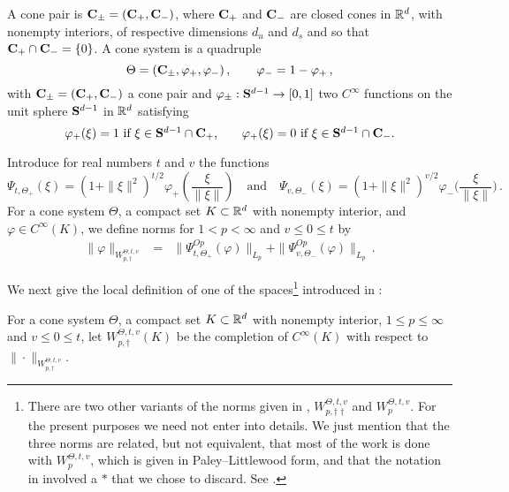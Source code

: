 \documentclass[10pt,twoside]{amsart}
\begin{document}
\begin{definition}
\label{defpol} A cone pair is 
$\mathbf{C}_\pm=(\mathbf{C}_+,\mathbf{C}_-)$, 
where  $\mathbf{C}_+$ and $\mathbf{C}_-$ are
closed cones in $\mathbb{R}^d$,  with nonempty interiors, of respective
dimensions $d_u$ and $d_s$ and so that $\mathbf{C}_+\cap\mathbf{C}_-=\{0\}$.
A cone system is a quadruple
$$\Theta=(\mathbf{C}_\pm,\varphi_+,\varphi_-)\, ,
\qquad \varphi_-=1-\varphi_+\, , $$  
with $\mathbf{C}_\pm=(\mathbf{C}_+,\mathbf{C}_-)$ a cone pair and
$\varphi_\pm:\mathbf{S}^{d-1}\to [0,1]$ two
$C^{\infty}$ functions on the unit sphere $\mathbf{S}^{d-1}$ in $\mathbb{R}^d$ satisfying
$$
 \varphi_+(\xi)=
1 \mbox{ if $\xi\in \mathbf{S}^{d-1}\cap \mathbf{C}_{+}$,}\qquad
\varphi_+(\xi)=0 \mbox{ if $\xi\in \mathbf{S}^{d-1}\cap \mathbf{C}_{-}$.}
$$
\end{definition}




Introduce for real numbers $t$ and $v$  the functions 
\[
\Psi_{t,\Theta_+}(\xi)=(1+\|\xi\|^2)^{t/2}\varphi_+
\left (\frac{\xi}{\|\xi\|}\right )\quad\mbox{and}
\quad \Psi_{v,\Theta_-}(\xi)=(1+\|\xi\|^2)^{v/2}
\varphi_-\biggl (\frac{\xi}{\|\xi\|} \biggr )\, .
\]
For a cone system $\Theta$, a compact set $K\subset \mathbb{R}^d$ with nonempty interior,
and $\varphi\in C^\infty(K)$,
we define norms  
for $1<p<\infty$ and $v \le 0 \le t$ by
\begin{eqnarray}
\label{daggernorms}  \|\varphi\|_{W^{\Theta, t,v}_{p,\dagger}}
&=&\|\Psi_{t,\Theta_+}^{Op}(\varphi)\|_{L_p}+
\|\Psi_{v,\Theta_-}^{Op}(\varphi)\|_{L_p}\, .
\end{eqnarray}


We next give the local definition of one of the  spaces\footnote{There are two other variants of the norms given in \cite{BT1}, $W^{\Theta,t,v}_{p,\dagger\dagger}$
and $W^{\Theta,t,v}_{p}$. For the present
purposes we need not  enter into details. We just mention that the three
norms are related, but not equivalent,  that most of the work is done with $W^{\Theta,t,v}_{p}$,
which is given in Paley--Littlewood form, and that the notation in
\cite{BT1} involved a $*$ that we chose to discard. See \cite[App. A]{BT1}.}
introduced in \cite{BT1}:

\begin{definition}
For a cone system $\Theta$,
a compact set $K\subset \mathbb{R}^d$ with nonempty interior, $1\le p\le\infty$ and $v \le 0
\le t$, let
$W^{\Theta,t,v}_{p,\dagger}(K)$ be the completion of 
$C^{\infty}(K)$ with respect to $\|\cdot \|_{W^{\Theta, t,v}_{p,\dagger}}$.
\end{definition}
\end{document}
